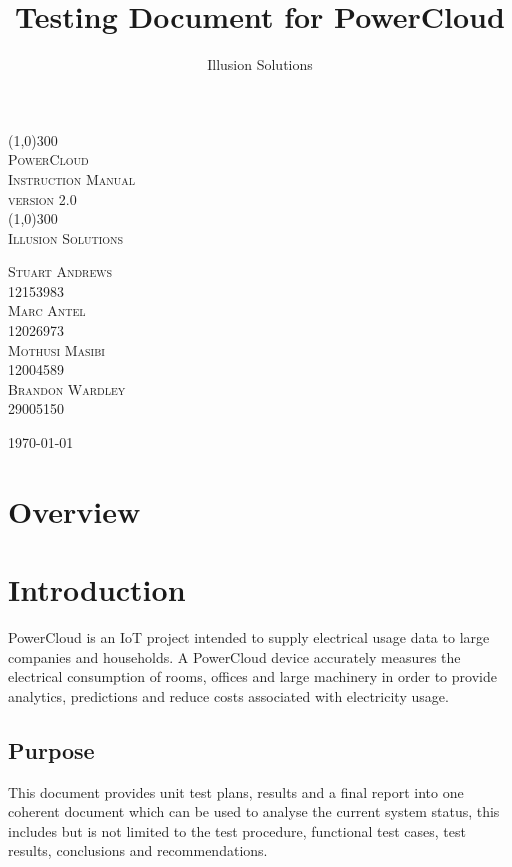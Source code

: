 \documentclass[a4paper,10pt]{article}
\title{Testing Document for PowerCloud}
\author{Illusion Solutions}
\begin{document}
	
	\begin{titlepage}
		\begin{center}
			\line(1,0){300} \\
			[0.1cm]
			\textsc{\Huge
				PowerCloud\\
				Instruction Manual
			} \\
			\textsc{\large version 2.0}\\
			[0.1cm]
			\line(1,0){300} \\
			[2.0cm]
			\textsc{\Large
				Illusion Solutions
			} \\
			[3.5cm]
			
		\end{center}
		\begin{flushright}
			\textsc{\Large
				Stuart Andrews\\ 
				12153983\\
				Marc Antel\\
				12026973\\
				Mothusi Masibi\\
				12004589\\
				Brandon Wardley\\
				29005150\\
				[4.0cm]
			}
		\end{flushright}
		\begin{center}
			\today
		\end{center}
	\end{titlepage}
	
	\newpage
	\tableofcontents
	\thispagestyle{empty}
	\newpage
	
	\section{Overview}

	\section{Introduction}
	PowerCloud is an IoT project intended to supply electrical usage data to large companies and 
	households. A PowerCloud device accurately measures the electrical consumption of rooms, offices and 
	large machinery in order to provide analytics, predictions and reduce costs associated with electricity 
	usage.
	
		\subsection{Purpose}
		This document provides unit test plans, results and a final report into one coherent document which can be used to analyse the current system status, this includes but is not limited to the test procedure, functional test cases, test results, conclusions and recommendations.
		
\end{document}
